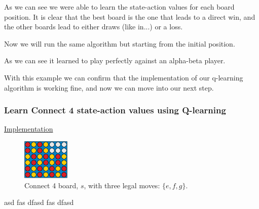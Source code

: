 \documentclass{article}
\newcommand{\GithubURL}[2]{
\noindent
\href{https://github.com/davidrobles/mlnd-capstone-code/blob/master/#1}{#2}
\break
}
\begin{document}
As we can see we were able to learn the state-action values for each board position. It
is clear that the best board is the one that leads to a direct win, and the other boards
lead to either draws (like in...) or a loss.

Now we will run the same algorithm but starting from the initial position. 


As we can see it learned to play perfectly against an alpha-beta player.

With this example we can confirm that the implementation of our q-learning algorithm
is working fine, and now we can move into our next step.

\subsubsection{Learn Connect 4 state-action values using Q-learning}

\GithubURL{examples/connect4_qlearning_values.py}{Implementation}


\begin{figure}[!h]
    \centering
    \includegraphics[width=0.2\textwidth]{figures/c4_ql_current.pdf}
    \caption{Connect 4 board, $s$, with three legal moves: $\{e, f, g\}$.}
    \label{fig:c4_ql_current}
\end{figure}

asd fas dfasd fas dfasd 

\end{document}
